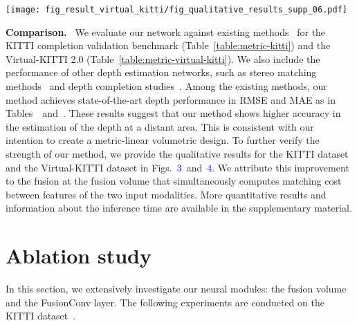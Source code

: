 \documentclass[letterpaper, 10 pt, conference]{ieeeconf}
\makeatletter
\DeclareRobustCommand\onedot{\futurelet\@let@token\@onedot}
\def\@onedot{\ifx\@let@token.\else.\null\fi\xspace}
\def\etal{\emph{et al}\onedot}
\newcommand{\Tref}[1]{Table~\textcolor{blue}{\ref{#1}}}
\newcommand{\RNum}[1]{\uppercase\expandafter{\romannumeral #1\relax}}
\makeatother
\begin{document}
\begin{figure*}[!t]
\vspace{+3mm}
\centering
\texttt{[image: fig\_result\_virtual\_kitti/fig\_qualitative\_results\_supp\_06.pdf]}
\vspace{-3mm}
\caption{\textbf{Qualitative results on the Virtual-KITTI 2.0 dataset.} 
We evaluate the estimated depth from both our network and the recent Stereo-LiDAR fusion network by Wang~\etal~\cite{stereolidar_norm_costV_ccvn}.
This synthetic data covers the wide range of depth upto ,
but we clamp true depth maps and estimated depth maps upto  during the evaluation, as in Table~\textcolor{blue}{\RNum{2}}. 
For the detailed visualization, we crop and enlarge the part of depth error maps in each frame.
Mainly, the cropped images correspond to the farther area to validate our long-range depth estimation.
}
\label{fig:fig_result_virtual_kitti}
\vspace{-2mm}
\end{figure*}


\noindent \textbf{Comparison.} \
We evaluate our network against existing methods~\cite{stereolidar_01,stereolidar_00,stereolidar_norm_costV_ccvn} for the KITTI completion validation benchmark (\Tref{table:metric-kitti}) and the Virtual-KITTI 2.0 (\Tref{table:metric-virtual-kitti}). We also include the performance of other depth estimation networks, such as stereo matching methods~\cite{psmnet,gcnet} and depth completion studies~\cite{sparse-to-dense,guidenet,jinsunpark,cspn++}. Among the existing methods, our method achieves state-of-the-art depth performance in RMSE and MAE as in Tables~\textcolor{blue}{\RNum{1}}~and~\textcolor{blue}{\RNum{2}}. These results suggest that our method shows higher accuracy in the estimation of the depth at a distant area. This is consistent with our intention to create a metric-linear volumetric design. To further verify the strength of our method, we provide the qualitative results for the KITTI dataset and the Virtual-KITTI dataset in Figs.~\textcolor{blue}{3}~and~\textcolor{blue}{4}. We attribute this improvement to the fusion at the fusion volume that simultaneously computes matching cost between features of the two input modalities. More quantitative results and information about the inference time are available in the supplementary material.


\vspace{-1mm}
\section{Ablation study}
\label{sec:Ablation study}
In this section, we extensively investigate our neural modules: the fusion volume and the FusionConv layer. 
The following experiments are conducted on the KITTI dataset~\cite{kitti-completion}.
\end{document}
